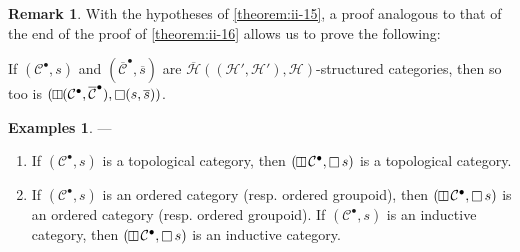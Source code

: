 \documentclass[a4paper,fleqn]{article}
\theoremstyle{plain}
\newenvironment{theorem}[1]
  {\renewcommand\theinnertheorem{#1}\innertheorem}
  {\endinnertheorem}
\theoremstyle{definition}
\newtheorem*{remark}{Remark}
\newtheorem*{examples}{Examples}
\newcommand{\CC}{\mathcal{C}}
\newcommand{\HH}{\mathcal{H}}
\newcommand{\vsqbox}{{\rotatebox{90}{$\boxminus$}}}
\DeclareMathOperator{\sq}{\square}
\DeclareMathOperator{\vsq}{\raisebox{-.1em}{$\vsqbox$}}
\begin{document}
\begin{remark}
  With the hypotheses of \cref{theorem:ii-15}, a proof analogous to that of the end of the proof of \cref{theorem:ii-16} allows us to prove the following:
\end{remark}

\begin{theorem}{15~bis}
\label{theorem:ii-15bis}
  If $(\CC^\bullet,s)$ and $(\overline{\CC}^\bullet,\overline{s})$ are $\overline{\HH}((\HH',\HH'),\HH)$-structured categories, then so too is $(\vsq(\CC^\bullet,\overline{\CC}^\bullet),\sq(s,\overline{s}))$.
\end{theorem}

\begin{examples}
  ---
  \begin{enumerate}
    \item[\normalfont(1)]
      If $(\CC^\bullet,s)$ is a topological category, then $(\vsq\CC^\bullet,\sq s)$ is a topological category.

    \item[\normalfont(2)]
      If $(\CC^\bullet,s)$ is an ordered category (resp. ordered groupoid), then $(\vsq\CC^\bullet,\sq s)$ is an ordered category (resp. ordered groupoid).
      If $(\CC^\bullet,s)$ is an inductive category, then $(\vsq\CC^\bullet,\sq s)$ is an inductive category.


\end{enumerate}
\end{examples}
\end{document}
